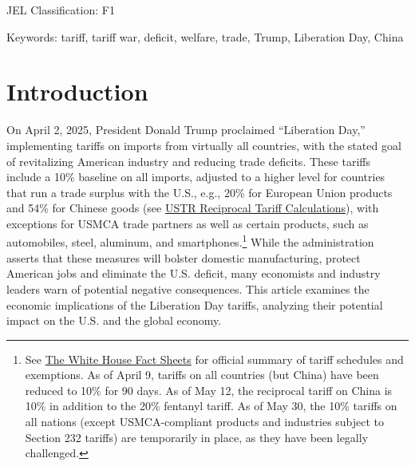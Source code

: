 \documentclass[12pt]{article}
\begin{document}

\indent JEL Classification: F1 

\indent Keywords: tariff, tariff war, deficit, welfare, trade, Trump, Liberation Day, China 











\newpage

\section{Introduction}

On April 2, 2025, President Donald Trump proclaimed ``Liberation Day,'' implementing tariffs on imports from virtually all countries, with the stated goal of revitalizing American industry and reducing trade deficits. These tariffs include a 10\% baseline on all imports, adjusted to a higher level for countries that run a trade surplus with the U.S., e.g.,  20\% for European Union products and 54\% for Chinese goods (see \href{https://ustr.gov/sites/default/files/files/Issue_Areas/Presidential%20Tariff%20Action/Reciprocal%20Tariff%20Calculations.pdf}{USTR Reciprocal Tariff Calculations}), with exceptions for USMCA trade partners as well as certain products, such as automobiles, steel, aluminum, and smartphones.\footnote{See \href{https://www.whitehouse.gov/fact-sheets/}{The White House Fact Sheets} for official summary of tariff schedules and exemptions. As of April 9, tariffs on all countries (but China) have been reduced to 10\% for 90 days. As of May 12, the reciprocal tariff on China is 10\% in addition to the 20\% fentanyl tariff. As of May 30, the 10\% tariffs on all nations (except USMCA-compliant products and industries subject to Section 232 tariffs) are temporarily in place, as they have been legally challenged.}  While the administration asserts that these measures will bolster domestic manufacturing, protect American jobs and eliminate the U.S. deficit, many economists and industry leaders warn of potential negative consequences. %
This article examines the economic implications of the Liberation Day tariffs, analyzing their potential impact on the U.S. and the global economy.
\end{document}
